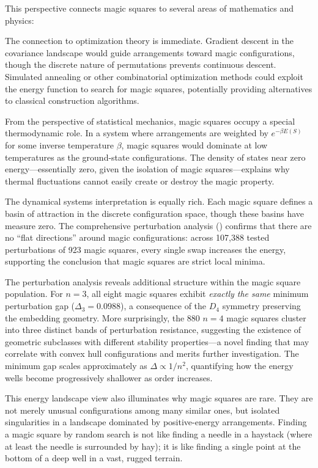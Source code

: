 This perspective connects magic squares to several areas of mathematics and physics:

The connection to optimization theory is immediate.
Gradient descent in the covariance landscape would guide arrangements toward magic configurations,
though the discrete nature of permutations prevents continuous descent.
Simulated annealing or other combinatorial optimization methods could exploit the energy function
to search for magic squares, potentially providing alternatives to classical construction algorithms.

From the perspective of statistical mechanics, magic squares occupy a special thermodynamic role.
In a system where arrangements are weighted by $e^{-\beta E(S)}$ for some inverse temperature $\beta$,
magic squares would dominate at low temperatures as the ground-state configurations.
The density of states near zero energy---essentially zero, given the isolation of magic squares---explains 
why thermal fluctuations cannot easily create or destroy the magic property.

The dynamical systems interpretation is equally rich.
Each magic square defines a basin of attraction in the discrete configuration space,
though these basins have measure zero.
The comprehensive perturbation analysis () confirms that 
there are no ``flat directions'' around magic configurations:
across 107,388 tested perturbations of 923 magic squares,
every single swap increases the energy, supporting the conclusion that magic squares are strict local minima.

The perturbation analysis reveals additional structure within the magic square population.
For $n=3$, all eight magic squares exhibit \emph{exactly the same} minimum perturbation gap 
($\Delta_3 = 0.0988$), a consequence of the $D_4$ symmetry preserving the embedding geometry.
More surprisingly, the 880 $n=4$ magic squares cluster into three distinct bands 
of perturbation resistance, suggesting the existence of geometric subclasses 
with different stability properties---a novel finding that may correlate 
with convex hull configurations and merits further investigation.
The minimum gap scales approximately as $\Delta \propto 1/n^2$,
quantifying how the energy wells become progressively shallower as order increases.

This energy landscape view also illuminates why magic squares are rare.
They are not merely unusual configurations among many similar ones, but isolated singularities 
in a landscape dominated by positive-energy arrangements.
Finding a magic square by random search is not like finding a needle in a haystack 
(where at least the needle is surrounded by hay);
it is like finding a single point at the bottom of a deep well in a vast, rugged terrain.

